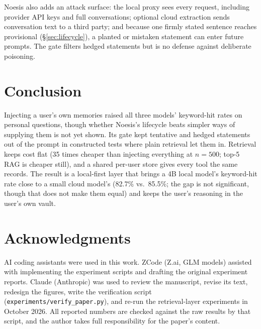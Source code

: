 \documentclass[11pt]{article}
\begin{document}
Noesis also adds an attack surface: the local proxy sees every request,
including provider API keys and full conversations; optional cloud extraction
sends conversation text to a third party; and because one firmly stated
sentence reaches provisional (\S\ref{sec:lifecycle}), a planted or mistaken
statement can enter future prompts. The gate filters hedged statements but is
no defense against deliberate poisoning.

\section{Conclusion}
\label{sec:conclusion}

Injecting a user's own memories raised all three models' keyword-hit rates on
personal questions, though whether Noesis's lifecycle beats simpler ways of
supplying them is not yet shown. Its gate kept tentative and hedged statements
out of the prompt in constructed tests where plain retrieval let them in.
Retrieval keeps cost flat (35 times cheaper than injecting everything at
$n{=}500$; top-5 RAG is cheaper still), and a shared per-user store gives
every tool the same records. The result is a local-first layer that brings a
4B local model's keyword-hit rate close to a small cloud model's (82.7\% vs.\
85.5\%; the gap is not significant, though that does not make them equal) and
keeps the user's reasoning in the user's own vault.

\section*{Acknowledgments}
AI coding assistants were used in this work. ZCode (Z.ai, GLM models)
assisted with implementing the experiment scripts and drafting the original
experiment reports. Claude (Anthropic) was used to review the manuscript,
revise its text, redesign the figures, write the verification script
(\texttt{experiments/verify\_paper.py}), and re-run the retrieval-layer
experiments in October 2026. All reported numbers are checked against the
raw results by that script, and the author takes full responsibility for the
paper's content.



\end{document}
